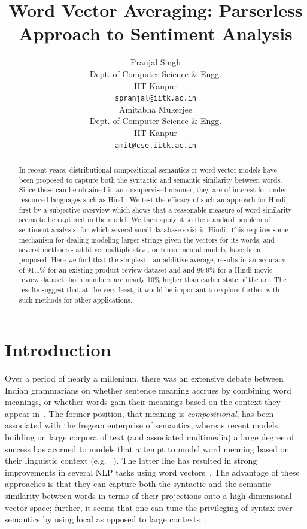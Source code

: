 \def\DevnagVersion{2.15}\documentclass[11pt]{article}
\title{Word Vector Averaging: Parserless Approach to Sentiment Analysis}
\author{Pranjal Singh \\
  Dept. of Computer Science \& Engg. \\
  IIT Kanpur \\
  {\tt spranjal@iitk.ac.in} \\\And
  Amitabha Mukerjee \\
  Dept. of Computer Science \& Engg. \\
  IIT Kanpur \\
  {\tt amit@cse.iitk.ac.in} \\}
\date{}
\begin{document}
\maketitle
\begin{abstract}
 In recent years, distributional compositional semantics or word vector models
have been proposed to capture both the syntactic and semantic similarity
between words.  Since these can be obtained in an unsupervised manner, they
are of interest for under-resourced languages such as Hindi.  We test the
efficacy of such an approach for Hindi, first by a subjective overview which
shows that a reasonable measure of word similarity seems to be captured in
the model.  We then apply it to the standard problem of sentiment analysis,
for which several small database exist in Hindi.  This requires some
mechanism for dealing modeling larger strings given the vectors for its
words, and several methods - additive, multiplicative, or tensor neural
models, have been proposed.  Here we find that the simplest - an additive
average, results in an accuracy of 91.1\% for an existing product review
dataset and and 89.9\% for a Hindi movie review dataset; both numbers are
nearly 10\% higher than earlier state of the art.  The results suggest that
at the very least, it would be important to explore further with such methods
for other applications.
\end{abstract}


\section{Introduction}
Over a period of nearly a millenium, there was an extensive debate between
Indian grammarians on whether sentence meaning accrues by combining word
meanings, or whether words gain their meanings based on the context they
appear in~\cite{Matilal:90}.  The former position, that
meaning is {\em compositional}, has been associated with the fregean
enterprise of semantics, whereas recent models, building on large corpora of
text (and associated multimedia) a large degree of success has accrued to
models that attempt to model word meaning based on their linguistic context
(e.g. ~\cite{Landauer:97}).  The latter line has resulted in strong improvements in several NLP tasks using word vectors~\cite{Collobert:08,Turian:10,Mikolov:13a,Socher:13}. 
The advantage of these approaches is that they can capture both the syntactic
and the semantic similarity between words in terms of their projections onto
a high-dimensional vector space; further, it seems that one can tune the
privileging of syntax over semantics by using local as opposed to large contexts~\cite{Huang:12}. 
\end{document}
